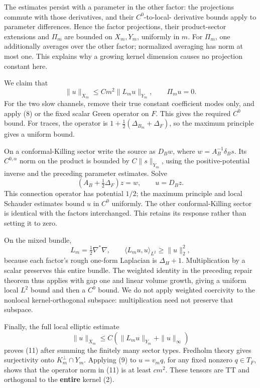 \documentclass[
  11pt,
]{article}
\begin{document}
The estimates persist with a parameter in the other factor: the
projections commute with those derivatives, and their \(C^0\)-to-local-
derivative bounds apply to parameter differences. Hence the factor
projections, their product-sector extensions and \(\Pi_m\) are bounded
on \(X_m,Y_m\), uniformly in \(m\). For \(\Pi_m\), one additionally
averages over the other factor; normalized averaging has norm at most
one. This explains why a growing kernel dimension causes no projection
constant here.

We claim that \[
 \boxed{\quad
 \|u\|_{X_m}\le C m^2\|L_mu\|_{Y_m},\qquad \Pi_mu=0.
 \quad}                                                       \tag{11}
\] For the two slow channels, remove their true constant coefficient
modes only, and apply (8) or the fixed scalar Green operator on \(F\).
This gives the required \(C^0\) bound. For traces, the operator is
\(1+\tfrac12(\Delta_{B_m}+\Delta_F)\), so the maximum principle gives a
uniform bound.

On a conformal-Killing sector write the source as \(D_Bw\), where
\(w=A_B^{-1}\delta_Bs\). Its \(C^{0,\alpha}\) norm on the product is
bounded by \(C\|s\|_{Y_m}\), using the positive-potential inverse and
the preceding parameter estimates. Solve \[
 (A_B+\tfrac12\Delta_F)z=w,
 \qquad u=D_Bz.
\] This connection operator has potential \(1/2\); the maximum principle
and local Schauder estimates bound \(u\) in \(C^0\) uniformly. The other
conformal-Killing sector is identical with the factors interchanged.
This retains its response rather than setting it to zero.

On the mixed bundle, \[
 L_m=\tfrac12\nabla^*\nabla,
 \qquad \langle L_mu,u\rangle_{L^2}\ge\|u\|_2^2,
\] because each factor's rough one-form Laplacian is \(\Delta_H+1\).
Multiplication by a scalar preserves this entire bundle. The weighted
identity in the preceding repair theorem thus applies with gap one and
linear volume growth, giving a uniform local \(L^2\) bound and then a
\(C^0\) bound. We do not apply weighted coercivity to the nonlocal
kernel-orthogonal subspace: multiplication need not preserve that
subspace.

Finally, the full local elliptic estimate \[
 \|u\|_{X_m}\le C(\|L_mu\|_{Y_m}+\|u\|_\infty)
\] proves (11) after summing the finitely many sector types. Fredholm
theory gives surjectivity onto \(K_m^\perp\cap Y_m\). Applying (9) to
\(u=v_mq\), for any fixed nonzero \(q\in T_F\), shows that the operator
norm in (11) is at least \(c m^2\). These tensors are TT and orthogonal
to the \textbf{entire} kernel (2).
\end{document}
